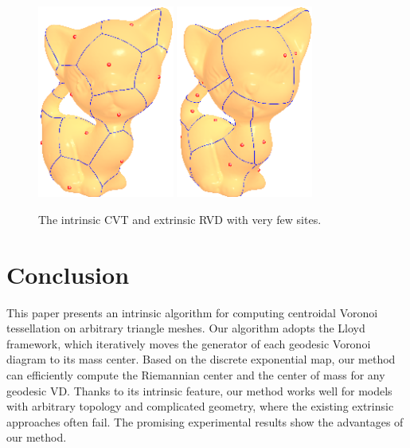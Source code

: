 \begin{figure}[htbp]
\centering
\includegraphics[width=0.4\textwidth]{figs/cvt/kitten_s20_GCVT.png}
\includegraphics[width=0.4\textwidth]{figs/cvt/kitten_s20_RVD_2.png}
\\
 \caption{The
intrinsic CVT and extrinsic RVD with very few sites.}
\label{fig:fewsites}
\end{figure}


\section{Conclusion}
\label{sec:conclusion}
This paper presents an intrinsic algorithm for computing centroidal Voronoi tessellation on arbitrary triangle meshes.
Our algorithm adopts the Lloyd framework, which iteratively moves the generator of each geodesic Voronoi diagram to its mass center.
Based on the discrete exponential map, our method can efficiently compute the Riemannian center and the center of mass for any geodesic VD.
Thanks to its intrinsic feature, our method works well for models with arbitrary topology and complicated geometry, where the existing extrinsic approaches often fail. The promising experimental results show the advantages of our method.

